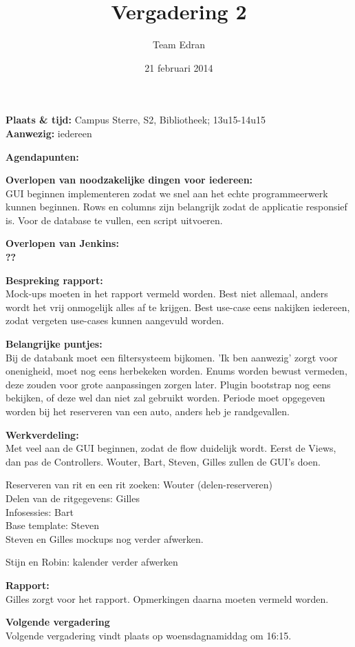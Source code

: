\documentclass[11pt,a4paper,oneside]{article}
\title{Vergadering 2}
\author{Team Edran}
\date{21 februari 2014}
\newcommand{\todo}[1]{{\color{red} \textbf{#1}}}
\renewenvironment{itemize}[1]{\begin{compactitem}#1}{\end{compactitem}}
\begin{document}
\maketitle

\textbf{Plaats \& tijd:}
Campus Sterre, S2, Bibliotheek; 13u15-14u15\\
\textbf{Aanwezig:} iedereen\par
\textbf{Agendapunten:}
\begin{itemize}
\item \textbf{Overlopen van noodzakelijke dingen voor iedereen: }\\
GUI beginnen implementeren zodat we snel aan het echte programmeerwerk kunnen beginnen.
Rows en columns zijn belangrijk zodat de applicatie responsief is.
Voor de database te vullen, een script uitvoeren.

\par\item \textbf{Overlopen van Jenkins:}\\ \todo{??}
\par\item \textbf{Bespreking rapport:}\\
Mock-ups moeten in het rapport vermeld worden. Best niet allemaal, anders wordt het vrij onmogelijk alles af te krijgen. Best use-case eens nakijken iedereen, zodat vergeten use-cases kunnen aangevuld worden.


\par\item \textbf{Belangrijke puntjes:}\\
Bij de databank moet een filtersysteem bijkomen.
'Ik ben aanwezig' zorgt voor onenigheid, moet nog eens herbekeken worden.
Enums worden bewust vermeden, deze zouden voor grote aanpassingen zorgen later.
Plugin bootstrap nog eens bekijken, of deze wel dan niet zal gebruikt worden.
Periode moet opgegeven worden bij het reserveren van een auto, anders heb je randgevallen. 

\par\item \textbf{Werkverdeling:} \\
Met veel aan de GUI beginnen, zodat de flow duidelijk wordt. Eerst de Views, dan pas de Controllers.
Wouter, Bart, Steven, Gilles zullen de GUI's doen.\par
Reserveren van rit en een rit zoeken: Wouter (delen-reserveren) \\
Delen van de ritgegevens: Gilles \\
Infosessies: Bart \\
Base template: Steven \\
Steven en Gilles mockups nog verder afwerken.

Stijn en Robin: kalender verder afwerken
\par\item \textbf{Rapport:} \\
Gilles zorgt voor het rapport. Opmerkingen daarna moeten vermeld worden.

\par\item \textbf{Volgende vergadering} \\
Volgende vergadering vindt plaats op woensdagnamiddag om 16:15.

\end{itemize}
\end{document}
